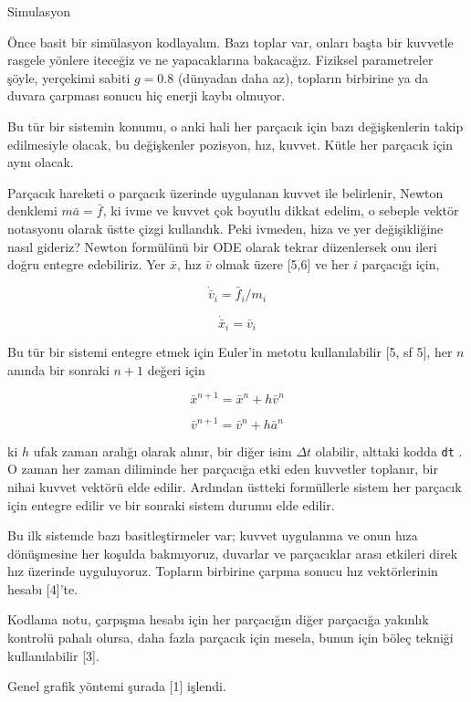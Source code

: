 \documentclass[12pt,fleqn]{article}\usepackage{../../common}
\begin{document}
Simulasyon

Önce basit bir simülasyon kodlayalım. Bazı toplar var, onları başta bir kuvvetle
rasgele yönlere iteceğiz ve ne yapacaklarına bakacağız. Fiziksel parametreler
şöyle, yerçekimi sabiti $g = 0.8$ (dünyadan daha az), topların birbirine ya da
duvara çarpması sonucu hiç enerji kaybı olmuyor.

Bu tür bir sistemin konumu, o anki hali her parçacık için bazı değişkenlerin
takip edilmesiyle olacak, bu değişkenler pozisyon, hız, kuvvet. Kütle her
parçacık için aynı olacak.

Parçacık hareketi o parçacık üzerinde uygulanan kuvvet ile belirlenir, Newton
denklemi $m \bar{a} = \bar{f}$, ki ivme ve kuvvet çok boyutlu dikkat edelim, o
sebeple vektör notasyonu olarak üstte çizgi kullandık. Peki ivmeden, hiza ve yer
değişikliğine nasıl gideriz? Newton formülünü bir ODE olarak tekrar düzenlersek
onu ileri doğru entegre edebiliriz. Yer $\bar{x}$, hız $\bar{v}$ olmak üzere
[5,6] ve her $i$ parçacığı için,

$$
\dot{\bar{v}}_i = \bar{f}_i / m_i
$$

$$
\dot{\bar{x}}_i = \bar{v}_i
$$

Bu tür bir sistemi entegre etmek için Euler'in metotu kullanılabilir [5, sf 5],
her $n$ anında bir sonraki $n+1$ değeri için

$$
\bar{x}^{n+1} = \bar{x}^n + h \bar{v}^n
$$

$$
\bar{v}^{n+1} = \bar{v}^n + h \bar{a}^n
$$

ki $h$ ufak zaman aralığı olarak alınır, bir diğer isim $\Delta t$ olabilir,
alttaki kodda \verb!dt! . O zaman her zaman diliminde her parçacığa etki eden
kuvvetler toplanır, bir nihai kuvvet vektörü elde edilir. Ardından üstteki
formüllerle sistem her parçacık için entegre edilir ve bir sonraki sistem durumu
elde edilir.

Bu ilk sistemde bazı basitleştirmeler var; kuvvet uygulanma ve onun hıza
dönüşmesine her koşulda bakmıyoruz, duvarlar ve parçacıklar arası etkileri direk
hız üzerinde uyguluyoruz. Topların birbirine çarpma sonucu hız vektörlerinin
hesabı [4]'te.

Kodlama notu, çarpışma hesabı için her parçacığın diğer parçacığa yakınlık
kontrolü pahalı olursa, daha fazla parçacık için mesela, bunun için böleç
tekniği kullanılabilir [3].

Genel grafik yöntemi şurada [1] işlendi.

\inputminted[fontsize=\footnotesize]{python}{sim.py}
\end{document}
